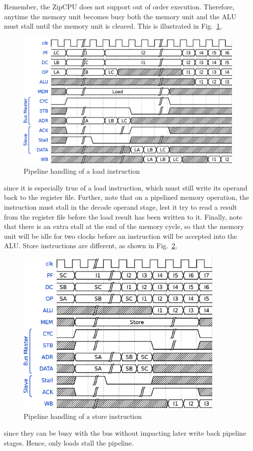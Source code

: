 \documentclass{gqtekspec}
\begin{document}
\begin{itemize}
	Remember, the ZipCPU does not support out of order execution.
	Therefore, anytime the memory unit becomes busy both the memory
	unit and the ALU must stall until the memory unit is cleared.  This
	is illustrated in Fig.~\ref{fig:memrd},
\begin{figure}\begin{center}
\includegraphics[width=5.6in]{../gfx/memrd.eps}
\caption{Pipeline handling of a load instruction}\label{fig:memrd}
\end{center}\end{figure}
	since it is especially true of a load instruction, which must still
	write its operand back to the register file.  Further, note that on a
	pipelined memory operation, the instruction must stall in the decode
	operand stage, lest it try to read a result from the register file
	before the load result has been written to it.  Finally, note that
	there is an extra stall at the end of the memory cycle, so that
	the memory unit will be idle for two clocks before an instruction will
	be accepted into the ALU.  Store instructions are different, as shown in
	Fig.~\ref{fig:memwr},
\begin{figure}\begin{center}
\includegraphics[width=4in]{../gfx/memwr.eps}
\caption{Pipeline handling of a store instruction}\label{fig:memwr}
\end{center}\end{figure}
	since they can be busy with the bus without impacting later write back
	pipeline stages.  Hence, only loads stall the pipeline.


\end{itemize}
\end{document}
